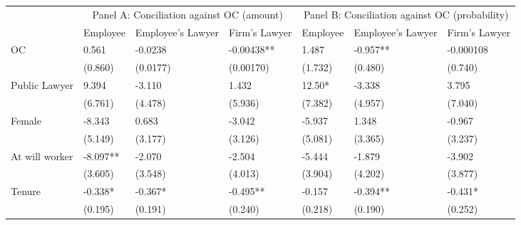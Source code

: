 \begin{tabular}{lcccccc}
      & \multicolumn{3}{c}{Panel A: Conciliation against OC (amount)} & \multicolumn{3}{c}{Panel B: Conciliation against OC (probability)} \\
\cmidrule{2-7}      & Employee & Employee's Lawyer & Firm's Lawyer & Employee & Employee's Lawyer & Firm's Lawyer \\
\cmidrule{2-7}OC    & \multicolumn{1}{l}{0.561} & \multicolumn{1}{l}{-0.0238} & \multicolumn{1}{l}{-0.00438**} & \multicolumn{1}{l}{1.487} & \multicolumn{1}{l}{-0.957**} & \multicolumn{1}{l}{-0.000108} \\
      & \multicolumn{1}{l}{(0.860)} & \multicolumn{1}{l}{(0.0177)} & \multicolumn{1}{l}{(0.00170)} & \multicolumn{1}{l}{(1.732)} & \multicolumn{1}{l}{(0.480)} & \multicolumn{1}{l}{(0.740)} \\
Public Lawyer & \multicolumn{1}{l}{9.394} & \multicolumn{1}{l}{-3.110} & \multicolumn{1}{l}{1.432} & \multicolumn{1}{l}{12.50*} & \multicolumn{1}{l}{-3.338} & \multicolumn{1}{l}{3.795} \\
      & \multicolumn{1}{l}{(6.761)} & \multicolumn{1}{l}{(4.478)} & \multicolumn{1}{l}{(5.936)} & \multicolumn{1}{l}{(7.382)} & \multicolumn{1}{l}{(4.957)} & \multicolumn{1}{l}{(7.040)} \\
Female & \multicolumn{1}{l}{-8.343} & \multicolumn{1}{l}{0.683} & \multicolumn{1}{l}{-3.042} & \multicolumn{1}{l}{-5.937} & \multicolumn{1}{l}{1.348} & \multicolumn{1}{l}{-0.967} \\
      & \multicolumn{1}{l}{(5.149)} & \multicolumn{1}{l}{(3.177)} & \multicolumn{1}{l}{(3.126)} & \multicolumn{1}{l}{(5.081)} & \multicolumn{1}{l}{(3.365)} & \multicolumn{1}{l}{(3.237)} \\
At will worker & \multicolumn{1}{l}{-8.097**} & \multicolumn{1}{l}{-2.070} & \multicolumn{1}{l}{-2.504} & \multicolumn{1}{l}{-5.444} & \multicolumn{1}{l}{-1.879} & \multicolumn{1}{l}{-3.902} \\
      & \multicolumn{1}{l}{(3.605)} & \multicolumn{1}{l}{(3.548)} & \multicolumn{1}{l}{(4.013)} & \multicolumn{1}{l}{(3.904)} & \multicolumn{1}{l}{(4.202)} & \multicolumn{1}{l}{(3.877)} \\
Tenure & \multicolumn{1}{l}{-0.338*} & \multicolumn{1}{l}{-0.367*} & \multicolumn{1}{l}{-0.495**} & \multicolumn{1}{l}{-0.157} & \multicolumn{1}{l}{-0.394**} & \multicolumn{1}{l}{-0.431*} \\
      & \multicolumn{1}{l}{(0.195)} & \multicolumn{1}{l}{(0.191)} & \multicolumn{1}{l}{(0.240)} & \multicolumn{1}{l}{(0.218)} & \multicolumn{1}{l}{(0.190)} & \multicolumn{1}{l}{(0.252)} \\

\end{tabular}
